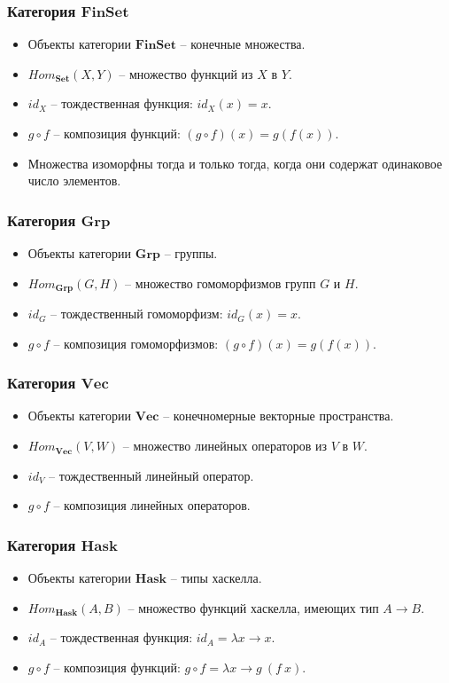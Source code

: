 \documentclass{beamer}
\newcommand{\cat}[1]{\mathbf{#1}}
\newcommand{\Set}{\cat{Set}}
\newcommand{\FinSet}{\cat{FinSet}}
\newcommand{\Grp}{\cat{Grp}}
\renewcommand{\Vec}{\cat{Vec}}
\newcommand{\Hask}{\cat{Hask}}
\begin{document}
\begin{frame}
\frametitle{Категория $\FinSet$}
\begin{itemize}
\item Объекты категории $\FinSet$ -- конечные множества.
\item $Hom_\Set(X, Y)$ -- множество функций из $X$ в $Y$.
\item $id_X$ -- тождественная функция: $id_X(x) = x$.
\item $g \circ f$ -- композиция функций: $(g \circ f)(x) = g(f(x))$.
\item Множества изоморфны тогда и только тогда, когда они содержат одинаковое число элементов.
\end{itemize}
\end{frame}

\begin{frame}
\frametitle{Категория $\Grp$}
\begin{itemize}
\item Объекты категории $\Grp$ -- группы.
\item $Hom_\Grp(G, H)$ -- множество гомоморфизмов групп $G$ и $H$.
\item $id_G$ -- тождественный гомоморфизм: $id_G(x) = x$.
\item $g \circ f$ -- композиция гомоморфизмов: $(g \circ f)(x) = g(f(x))$.
\end{itemize}
\end{frame}

\begin{frame}
\frametitle{Категория $\Vec$}
\begin{itemize}
\item Объекты категории $\Vec$ -- конечномерные векторные пространства.
\item $Hom_\Vec(V, W)$ -- множество линейных операторов из $V$ в $W$.
\item $id_V$ -- тождественный линейный оператор.
\item $g \circ f$ -- композиция линейных операторов.
\end{itemize}
\end{frame}

\begin{frame}
\frametitle{Категория $\Hask$}
\begin{itemize}
\item Объекты категории $\Hask$ -- типы хаскелла.
\item $Hom_\Hask(A, B)$ -- множество функций хаскелла, имеющих тип $A \to B$.
\item $id_A$ -- тождественная функция: $id_A = \lambda x \to x$.
\item $g \circ f$ -- композиция функций: $g \circ f = \lambda x \to g\ (f\ x)$.
\end{itemize}
\end{frame}
\end{document}
